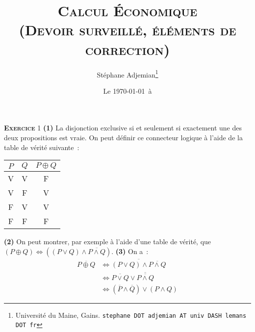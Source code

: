 \documentclass[10pt,a4paper,notitlepage]{article}
\newcommand{\exercice}[1]{\textsc{\textbf{Exercice}} #1}
\providecommand{\lxor}{\oplus}
\begin{document}
\title{\textsc{Calcul Économique\\ \small{(Devoir surveillé, éléments de correction)}}}
\author{Stéphane Adjemian\thanks{Université du Maine, Gains. \texttt{stephane DOT adjemian AT univ DASH lemans DOT fr}}}
\date{Le \today\ à \thistime}

\maketitle

\exercice{1} \textbf{(1)} La disjonction exclusive si et seulement si exactement une des deux propositions
est vraie. On peut définir ce connecteur logique à l'aide de la table
de vérité suivante :

\begin{table}[H]
  \centering
  \begin{tabular}[H]{ccc}
    \hline
    $P$ & $Q$ & $P \lxor Q$ \\ \hline
    V & V & F \\
    V & F & V \\
    F & V & V \\
    F & F & F \\ \hline\hline
  \end{tabular}
\end{table}

\textbf{(2)} On peut montrer, par exemple à l'aide d'une table de vérité, que $(P \lxor Q) \Leftrightarrow ((P \lor Q) \land \overline{P\land Q})$. \textbf{(3)} On a :
\[
  \begin{split}
    \overline{P \lxor Q} &\Leftrightarrow \overline{(P \lor Q) \land \overline{P\land Q}}\\
    &\Leftrightarrow \overline{P \lor Q} \lor \overline{\overline{P\land Q}}\\
    &\Leftrightarrow (\overline{P} \land \overline{Q}) \lor (P\land Q) 
  \end{split}
\]

\bigskip
\end{document}
